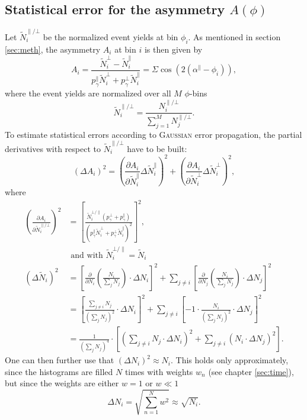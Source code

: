 \chapter{}
\label{sec:app}
\section{Statistical error for the asymmetry $A(\phi)$}
\label{sec:stat_err}
Let $\tilde{N}^{\parallel/\bot}_i$ be the normalized event yields at bin $\phi_i$. As mentioned in section \ref{sec:meth}, the asymmetry $A_i$ at bin $i$ is then given by
\begin{equation}
	A_i=\frac{\tilde{N}^\bot_i-\tilde{N}^\parallel_i}{p_\gamma^\parallel\tilde{N}^\bot_i+p_\gamma^\bot\tilde{N}^\parallel_i}=\Sigma\cos\left(2\left(\alpha^\parallel-\phi_i\right)\right),
	\label{eq:evyieldasym_app}
\end{equation}
where the event yields are normalized over all $M$ $\phi$-bins $$\tilde{N}^{\parallel/\bot}_i=\frac{N_i^{\parallel/\bot}}{\sum_{j=1}^{M}N_j^{\parallel/\bot}}.$$
 To estimate statistical errors according to \textsc{Gaussian} error propagation, the partial derivatives with respect to $\tilde{N}_i^{\parallel/\bot}$ have to be built:
 \begin{equation}
 	\left(\Delta A_i\right)^2=\left(\frac{\partial A_i}{\partial \tilde{N}^\parallel_i}\Delta \tilde{N}^\parallel_i\right)^2+\left(\frac{\partial A_i}{\partial \tilde{N}^\bot_i}\Delta \tilde{N}^\bot_i\right)^2,
 \end{equation}
where
\begin{align}
	\left(\frac{\partial A_i}{\partial \tilde{N}^{\parallel/\bot}_i}\right)^2&=\left[\frac{\tilde{N}^{\bot/\parallel}_i\left(p_\gamma^\bot+p_\gamma^\parallel\right)}{\left(p_\gamma^\parallel\tilde{N}^{\bot}_i+p_\gamma^\bot\tilde{N}^\parallel_i\right)^2}\right]^2,\\
	&\text{ and with } \tilde{N}_i^{\bot/\parallel}=\tilde{N}_i\\
	\left(\Delta\tilde{N}_i\right)^2&=\left[\frac{\partial}{\partial N_i}\left(\frac{N_i}{\sum_{j}N_j}\right)\cdot\Delta N_i\right]^2+\sum_{j\neq i}\left[\frac{\partial}{\partial N_j}\left(\frac{N_i}{\sum_{j}N_j}\right)\cdot\Delta N_j\right]^2\\
	&=\left[\frac{\sum_{j\neq i} N_j}{\left(\sum_{j} N_j\right)^2}\cdot\Delta N_i\right]^2+\sum_{j\neq i}\left[-1\cdot\frac{N_i}{\left(\sum_{j}N_j\right)^2}\cdot\Delta N_j\right]^2\\
	&=\frac{1}{\left(\sum_{j} N_j\right)^4}\cdot\left[\left(\sum_{j\neq i} N_j \cdot\Delta N_i\right)^2+\sum_{j\neq i}\left(N_i\cdot\Delta N_j\right)^2\right].
\end{align}
One can then further use that $\left(\Delta N_i\right)^2  \approx N_i$. This holds only approximately, since the histograms are filled $N$ times with weights $w_n$ (see chapter \ref{sec:time}), but since the weights are either $w=1$ or $w\ll1$
\begin{equation}
	\Delta N_i=\sqrt{\sum_{n=1}^N w^2}\approx\sqrt{N_i}.
\end{equation}